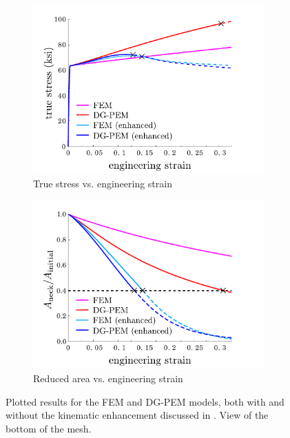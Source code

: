 \begin{figure}[!h]
  \centering
    \begin{subfigure}[b]{0.49\linewidth}
            \centering
            \includegraphics[width=3.5in]{figures/necking_stress_strain.pdf}
    			\caption{True stress vs. engineering strain \label{fig:necking_stress_strain}}
    \end{subfigure}
	\begin{subfigure}[b]{0.49\linewidth}
            \centering
            \includegraphics[width=3.5in]{figures/necking_area_reduction.pdf}
    			\caption{Reduced area vs. engineering strain \label{fig:necking_area_reduction}}
    \end{subfigure} \caption{Plotted results for the FEM and DG-PEM models, both with and without the kinematic enhancement discussed in \cite{Rashid:06}. View of the bottom of the mesh.}
  \label{fig:necking_plots}
\end{figure}

